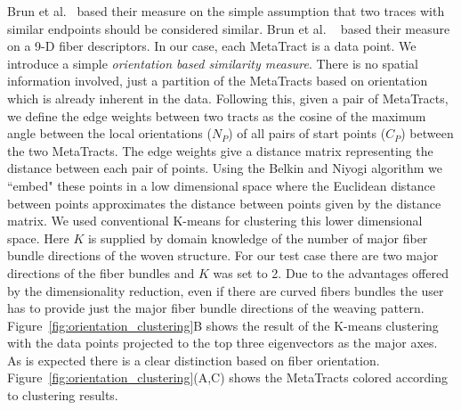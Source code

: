 Brun et al.~\cite{Brun2003} based their measure on the simple assumption that two traces with similar endpoints should be considered similar. Brun et al. ~\cite{Brun2004} based their measure on a 9-D fiber descriptors. In our case, each MetaTract is a data point. We introduce a simple \textit{orientation based similarity measure}. There is no spatial information involved, just a partition of the MetaTracts based on orientation which is already inherent in the data.
Following this, given a pair of  MetaTracts, we define the edge weights between two tracts as the cosine of the maximum angle between the local orientations ($N_P$) of all pairs of start points ($C_P$) between the two MetaTracts. The edge weights give a distance matrix representing the distance between each pair of points. Using the Belkin and Niyogi algorithm we ``embed" these points in a low dimensional space where the Euclidean distance between points approximates the distance between points given by the distance matrix. 
%
%  
We used conventional K-means for clustering this lower dimensional space. Here $K$ is supplied by domain knowledge of the number of major fiber bundle directions of the woven structure.
For our test case there are two major directions of the fiber bundles and $K$ was set to 2. Due to the advantages offered by the dimensionality reduction, even if there are curved fibers bundles the user has to provide just the major fiber bundle directions of the weaving pattern. Figure~\ref{fig:orientation_clustering}B shows the result of the K-means clustering with the data points projected to the top three eigenvectors as the major axes. As is expected there is a clear distinction based on fiber orientation. Figure~\ref{fig:orientation_clustering}(A,C) shows the MetaTracts colored according to clustering results.

